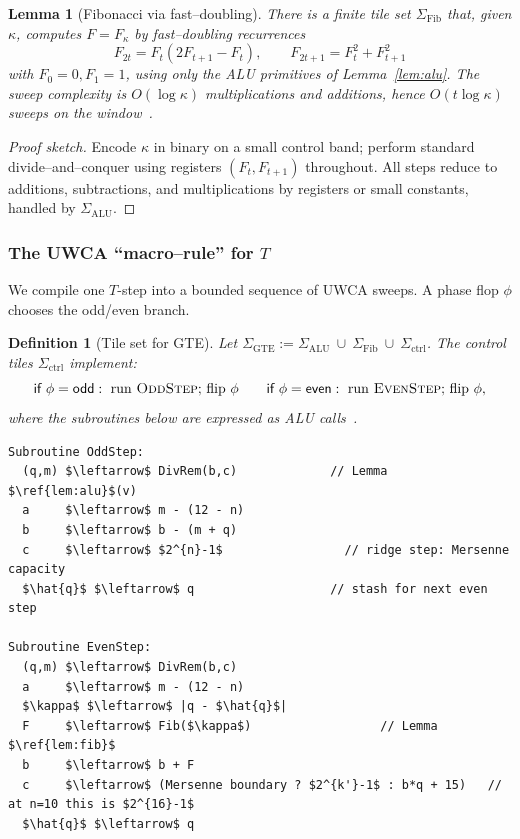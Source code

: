 \documentclass[12pt]{article}
\newtheorem{lemma}[theorem]{Lemma}
\newtheorem{definition}[theorem]{Definition}
\numberwithin{equation}{section}
\begin{document}
\begin{lemma}[Fibonacci via fast–doubling]\label{lem:fib}
There is a finite tile set \(\Sigma_{\mathrm{Fib}}\) that, given \(\kappa\), computes \(F=F_{\kappa}\) by fast–doubling recurrences
\[
F_{2t}=F_t(2F_{t+1}-F_t),\qquad F_{2t+1}=F_t^2+F_{t+1}^2
\]
with \(F_0=0,F_1=1\), using only the ALU primitives of Lemma~\ref{lem:alu}. The sweep complexity is \(O(\log \kappa)\) multiplications and additions, hence \(O(t\log \kappa)\) sweeps on the window~\cite{SpivackUGPFormalization,ugp-lean}.
\end{lemma}

\begin{proof}[Proof sketch]
Encode \(\kappa\) in binary on a small control band; perform standard divide--and--conquer using registers \((F_t,F_{t+1})\) throughout. All steps reduce to additions, subtractions, and multiplications by registers or small constants, handled by \(\Sigma_{\mathrm{ALU}}\).
\end{proof}

\subsubsection{The UWCA ``macro–rule'' for \(T\)}\label{subsec:gte-macro}
We compile one \(T\)-step into a bounded sequence of UWCA sweeps. A phase flop \(\phi\) chooses the odd/even branch.

\begin{definition}[Tile set for GTE]\label{def:sigma-gte}
Let \(\Sigma_{\mathrm{GTE}}:=\Sigma_{\mathrm{ALU}}\ \cup\ \Sigma_{\mathrm{Fib}}\ \cup\ \Sigma_{\mathrm{ctrl}}\). The control tiles \(\Sigma_{\mathrm{ctrl}}\) implement:
\[
\textsf{if }\phi=\textsf{odd}:\ \text{run \textsc{OddStep}; flip }\phi
\qquad
\textsf{if }\phi=\textsf{even}:\ \text{run \textsc{EvenStep}; flip }\phi,
\]
where the subroutines below are expressed as ALU calls~\cite{SpivackUGPFormalization,ugp-lean}.
\end{definition}

\begin{lstlisting}[mathescape=true,basicstyle=\ttfamily\small,caption={UWCA macro–rule for one $T$ step},label={lst:uwca-macro}]
Subroutine OddStep:
  (q,m) $\leftarrow$ DivRem(b,c)             // Lemma $\ref{lem:alu}$(v)
  a     $\leftarrow$ m - (12 - n)
  b     $\leftarrow$ b - (m + q)
  c     $\leftarrow$ $2^{n}-1$                 // ridge step: Mersenne capacity
  $\hat{q}$ $\leftarrow$ q                   // stash for next even step

Subroutine EvenStep:
  (q,m) $\leftarrow$ DivRem(b,c)
  a     $\leftarrow$ m - (12 - n)
  $\kappa$ $\leftarrow$ |q - $\hat{q}$|
  F     $\leftarrow$ Fib($\kappa$)                  // Lemma $\ref{lem:fib}$
  b     $\leftarrow$ b + F
  c     $\leftarrow$ (Mersenne boundary ? $2^{k'}-1$ : b*q + 15)   // at n=10 this is $2^{16}-1$
  $\hat{q}$ $\leftarrow$ q
\end{lstlisting}
\end{document}
